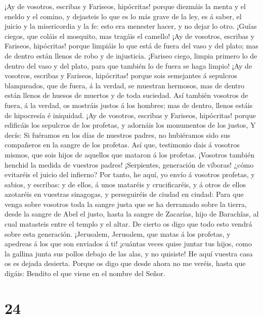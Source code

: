  ¡Ay de vosotros, escribas y Fariseos, hipócritas! porque
diezmáis la menta y el eneldo y el comino, y dejasteis lo que es lo más
grave de la ley, es á saber, el juicio y la misericordia y la fe: esto
era menester hacer, y no dejar lo otro.  ¡Guías ciegos, que
coláis el mosquito, mas tragáis el camello!  ¡Ay de
vosotros, escribas y Fariseos, hipócritas! porque limpiáis lo que está
de fuera del vaso y del plato; mas de dentro están llenos de robo y de
injusticia.  ¡Fariseo ciego, limpia primero lo de dentro
del vaso y del plato, para que también lo de fuera se haga limpio!
 ¡Ay de vosotros, escribas y Fariseos, hipócritas! porque
sois semejantes á sepulcros blanqueados, que de fuera, á la verdad, se
muestran hermosos, mas de dentro están llenos de huesos de muertos y de
toda suciedad.  Así también vosotros de fuera, á la verdad,
os mostráis justos á los hombres; mas de dentro, llenos estáis de
hipocresía é iniquidad.  ¡Ay de vosotros, escribas y
Fariseos, hipócritas! porque edificáis los sepulcros de los profetas, y
adornáis los monumentos de los justos,  Y decís: Si
fuéramos en los días de nuestros padres, no hubiéramos sido sus
compañeros en la sangre de los profetas.  Así que,
testimonio dais á vosotros mismos, que sois hijos de aquellos que
mataron á los profetas.  ¡Vosotros también henchid la
medida de vuestros padres!  ¡Serpientes, generación de
víboras! ¿cómo evitaréis el juicio del infierno?  Por
tanto, he aquí, yo envío á vosotros profetas, y sabios, y escribas: y de
ellos, á unos mataréis y crucificaréis, y á otros de ellos azotaréis en
vuestras sinagogas, y perseguiréis de ciudad en ciudad: 
Para que venga sobre vosotros toda la sangre justa que se ha derramado
sobre la tierra, desde la sangre de Abel el justo, hasta la sangre de
Zacarías, hijo de Barachîas, al cual matasteis entre el templo y el
altar.  De cierto os digo que todo esto vendrá sobre esta
generación.  ¡Jerusalem, Jerusalem, que matas á los
profetas, y apedreas á los que son enviados á ti! ¡cuántas veces quise
juntar tus hijos, como la gallina junta sus pollos debajo de las alas, y
no quisiste!  He aquí vuestra casa os es dejada desierta.
 Porque os digo que desde ahora no me veréis, hasta que
digáis: Bendito el que viene en el nombre del Señor.

\hypertarget{section-23}{%
\section{24}\label{section-23}}

